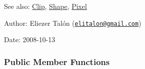 \begin{Desc}
\item[See also:]\hyperlink{class_clip}{Clip}, \hyperlink{class_shape}{Shape}, \hyperlink{_pixel_8hpp_535e59456e3e633842529cfa8ea103c4}{Pixel}\end{Desc}
\begin{Desc}
\item[Author:]Eliezer Talón (\href{mailto:elitalon@gmail.com}{\tt elitalon@gmail.com}) \end{Desc}
\begin{Desc}
\item[Date:]2008-10-13 \end{Desc}
\subsubsection*{Public Member Functions}
